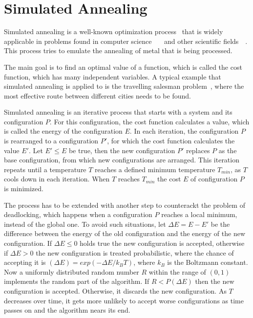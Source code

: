 \documentclass[draft,final]{vutinfth} %
\begin{document}
\section{Simulated Annealing}
\label{sec:sa}
Simulated annealing is a well-known optimization process~\cite{kirkpatrick1983optimization} that is widely applicable in problems found in computer science~\cite{goffe1994global}~\cite{dekkers1991global}~\cite{brooks1995optimization} and other scientific fields~\cite{pannetier1990prediction}~\cite{sutter1995automated}. This process tries to emulate the annealing of metal that is being processed.

The main goal is to find an optimal value of a function, which is called the cost function, which has many independent variables. A typical example that simulated annealing is applied to is the travelling salesman problem~\cite{malek1989serial}, where the most effective route between different cities needs to be found. 

Simulated annealing is an iterative process that starts with a system and its configuration $P$. For this configuration, the cost function calculates a value, which is called the energy of the configuration $E$. In each iteration, the configuration $P$ is rearranged to a configuration $P'$, for which the cost function calculates the value $E'$. Let $E' \leq E$ be true, then the new configuration $P'$ replaces $P$ as the base configuration, from which new configurations are arranged. This iteration repeats until a temperature $T$ reaches a defined minimum temperature $T_{min}$, as $T$ cools down in each iteration. When $T$ reaches $T_{min}$ the cost $E$ of configuration $P$ is minimized.

The process has to be extended with another step to counterackt the problem of deadlocking, which happens when a configuration $P$ reaches a local minimum, instead of the global one. To avoid such situations, let $\Delta E = E - E'$ be the difference between the energy of the old configuration and the energy of the new configuration. If $\Delta E \leq 0$ holds true  the new configuration is accepted, otherwise if $\Delta E > 0$ the new configuration is treated probabilistic, where the chance of accepting it is $(\Delta E) = exp(-\Delta E / k_B T)$, where $k_B$ is the Boltzmann constant. Now a uniformly distributed random number $R$ within the range of $(0,1)$ implements the random part of the algorithm. If $R < P(\Delta E)$ then the new configuration is accepted. Otherwise, it discards the new configuration. As $T$ decreases over time, it gets more unlikely to accept worse configurations as time passes on and the algorithm nears its end.
\end{document}
